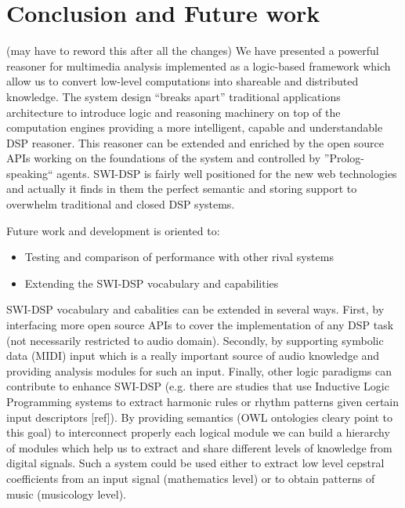 \documentclass[runningheads]{llncs}
\begin{document}



\section{Conclusion and Future work}\label{sec:conclusion}

(may have to reword this after all the changes)
We have presented a powerful reasoner for multimedia analysis implemented as a logic-based framework which allow us to convert low-level computations into shareable and distributed knowledge. The system design ``breaks apart'' traditional applications architecture to introduce logic and reasoning machinery on top of the computation engines providing a more intelligent, capable and understandable DSP reasoner. This reasoner can be extended and enriched by the open source APIs working on the foundations of the system and controlled by ''Prolog-speaking`` agents. SWI-DSP is fairly well positioned for the new web technologies and actually it finds in them the perfect semantic and storing support to overwhelm traditional and closed DSP systems.

Future work and development is oriented to:

\begin{itemize}
 \item Testing and comparison of performance with other rival systems
 \item Extending the SWI-DSP vocabulary and capabilities
\end{itemize}

SWI-DSP vocabulary and cabalities can be extended in several ways. First, by interfacing more open source APIs to cover the implementation of any DSP task (not necessarily restricted to audio domain). Secondly, by supporting symbolic data (MIDI) input which is a really important source of audio knowledge and providing analysis modules for such an input. Finally, other logic paradigms can contribute to enhance SWI-DSP (e.g. there are studies that use Inductive Logic Programming systems to extract harmonic rules or rhythm patterns given certain input descriptors [ref]). By providing semantics (OWL ontologies cleary point to this goal) to interconnect properly each logical module we can build a hierarchy of modules which help us to extract and share different levels of knowledge from digital signals. Such a system could be used either to extract low level cepstral coefficients from an input signal (mathematics level) or to obtain patterns of music (musicology level).
\end{document}

